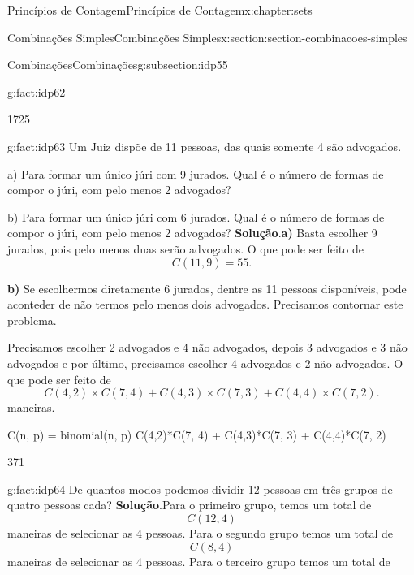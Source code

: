 \documentclass[oneside,10pt,]{book}
\newcommand{\blocktitlefont}{\relax}
\newcommand{\terminology}[1]{\textbf{#1}}
\numberwithin{equation}{section}
\begin{document}
\begin{chapterptx}{Princípios de Contagem}{}{Princípios de Contagem}{}{}{x:chapter:sets}
\begin{sectionptx}{Combinações Simples}{}{Combinações Simples}{}{}{x:section:section-combinacoes-simples}
\begin{subsectionptx}{Combinações}{}{Combinações}{}{}{g:subsection:idp55}
\begin{fact}{}{}{g:fact:idp62}
\begin{sageoutput}
1725
\end{sageoutput}
\end{fact}
\begin{fact}{}{}{g:fact:idp63}%
Um Juiz dispõe de 11 pessoas, das quais somente 4 são advogados.%
\par
a) Para formar um único júri com 9 jurados. Qual é o número de formas de compor o júri, com pelo menos 2 advogados?%
\par
b) Para formar um único júri com 6 jurados. Qual é o número de formas de compor o júri, com pelo menos 2 advogados?%
\textbf{\blocktitlefont Solução}.\quad{}\terminology{a)} Basta escolher 9 jurados, pois pelo menos duas serão advogados. O que pode ser feito de%
\begin{equation*}
C(11,9)=55. 
\end{equation*}
%
\par
\terminology{b)} Se escolhermos diretamente 6 jurados, dentre as 11 pessoas disponíveis, pode aconteder de não termos pelo menos dois advogados. Precisamos contornar este problema.%
\par
Precisamos escolher 2 advogados e 4 não advogados, depois 3 advogados e 3 não advogados e por último, precisamos escolher 4 advogados e 2 não advogados. O que pode ser feito de%
\begin{equation*}
C(4,2)\times C(7, 4) + C(4,3)\times C(7, 3) + C(4,4)\times C(7, 2). 
\end{equation*}
maneiras.%
\begin{sageinput}
C(n, p) = binomial(n, p)
C(4,2)*C(7, 4) + C(4,3)*C(7, 3) + C(4,4)*C(7, 2)
\end{sageinput}
\begin{sageoutput}
371
\end{sageoutput}
\end{fact}
\begin{fact}{}{}{g:fact:idp64}%
De quantos modos podemos dividir 12 pessoas em três grupos de quatro pessoas cada?%
\textbf{\blocktitlefont Solução}.\quad{}Para o primeiro grupo, temos um total de%
\begin{equation*}
C(12, 4) 
\end{equation*}
maneiras de selecionar as 4 pessoas. Para o segundo grupo temos um total de%
\begin{equation*}
C(8, 4) 
\end{equation*}
maneiras de selecionar as 4 pessoas. Para o terceiro grupo temos um total de%
\begin{equation*}

\end{equation*}
\end{fact}
\end{subsectionptx}
\end{sectionptx}
\end{chapterptx}
\end{document}
